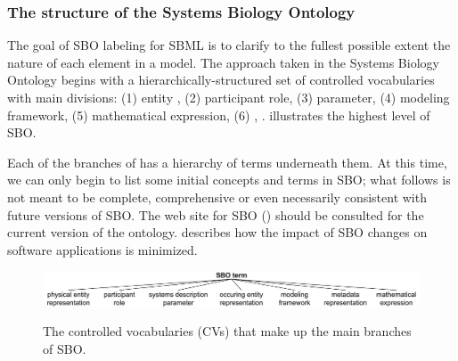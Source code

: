 \subsubsection{The structure of the Systems Biology Ontology}

The goal of SBO labeling for SBML is to clarify to the fullest
possible extent the nature of each element in a model.  The
approach taken in the Systems Biology Ontology begins with a
hierarchically-structured set of controlled vocabularies with 
main divisions: (1)  entity , (2) participant role, (3)  parameter, (4) modeling framework, (5)
mathematical expression, (6) , .   illustrates
the highest level of SBO.

Each of the  branches of  has a
hierarchy of terms underneath them.  At this time, we can only
begin to list some initial concepts and terms in SBO; what follows
is not meant to be complete, comprehensive or even necessarily
consistent with future versions of SBO.    The web site for SBO
(\sboref) should be consulted for the current version of the
ontology.   describes how
the impact of SBO changes on software applications is minimized.

\begin{figure}[tbh]
  \centering
             {\includegraphics[scale=0.8]{figs/sbo-top-level-l3v2}}
  \vspace*{1ex}
  \caption{The  controlled vocabularies (CVs) that
      make up the main branches of SBO.}
  \label{fig:sbo-top-level}
\end{figure}


